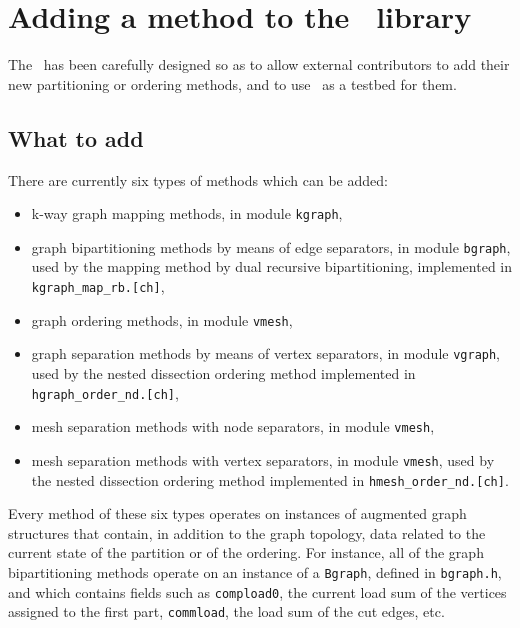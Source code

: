 
\section{Adding a method to the \libscotch\ library}
\label{sec-method}

The \libscotch\ has been carefully designed so as to allow external
contributors to add their new partitioning or ordering methods, and
to use \scotch\ as a testbed for them.

\subsection{What to add}

There are currently six types of methods which can be added:
\begin{itemize}
\item
k-way graph mapping methods, in module {\tt kgraph},
\item
graph bipartitioning methods by means of edge separators, in module
{\tt bgraph}, used by the mapping method by dual recursive
bipartitioning, implemented in {\tt kgraph\_\lbt map\_\lbt rb.[ch]},
\item
graph ordering methods, in module {\tt vmesh},
\item
graph separation methods by means of vertex separators, in module
{\tt vgraph}, used by the nested dissection ordering method
implemented in {\tt hgraph\_\lbt order\_\lbt nd.[ch]},
\item
mesh separation methods with node separators, in module
{\tt vmesh},
\item
mesh separation methods with vertex separators, in module
{\tt vmesh}, used by the nested dissection ordering method
implemented in {\tt hmesh\_\lbt order\_\lbt nd.[ch]}.
\end{itemize}
Every method of these six types operates on instances of augmented
graph structures that contain, in addition to the graph topology,
data related to the current state of the partition or of the
ordering. For instance, all of the graph bipartitioning methods
operate on an instance of a {\tt Bgraph}, defined in {\tt bgraph.h},
and which contains fields such as {\tt compload0}, the current load
sum of the vertices assigned to the first part, {\tt commload}, the
load sum of the cut edges, etc.

